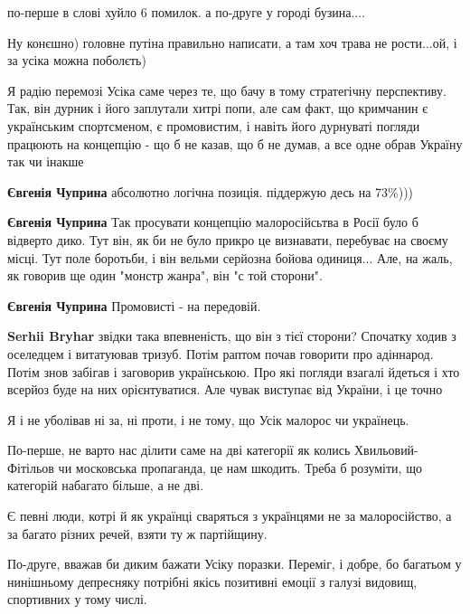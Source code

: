 \begin{itemize}
\begin{itemize}
по-перше в слові хуйло 6 помилок. а по-друге у городі бузина....

Ну конєшно) головне путіна правильно написати, а там хоч трава не рости...ой, і за усіка можна поболєть)
\end{itemize} %


Я радію перемозі Усіка саме через те, що бачу в тому стратегічну перспективу.
Так, він дурник і його заплутали хитрі попи, але сам факт, що кримчанин є
українським спортсменом, є промовистим, і навіть його дурнуваті погляди
працюють на концепцію - що б не казав, що б не думав, а все одне обрав Україну
так чи інакше

\begin{itemize} %
\textbf{Євгенія Чуприна} абсолютно логічна позиція. піддержую десь на 73\%)))

\textbf{Євгенія Чуприна} Так просувати концепцію малоросійсьтва в Росії було б відверто дико. Тут він, як би не було прикро це визнавати, перебуває на своєму місці. Тут поле боротьби, і він вельми серйозна бойова одиниця... Але, на жаль, як говорив ще один "монстр жанра", він "с той сторони".

\textbf{Євгенія Чуприна}
Промовисті - на передовій.

\textbf{Serhii Bryhar} звідки така впевненість, що він з тієї сторони? Спочатку ходив з оселедцем і витатуював тризуб. Потім раптом почав говорити про адіннарод. Потім знов забігав і заговорив українською. Про які погляди взагалі йдеться і хто всерйоз буде на них орієнтуватися. Але чувак виступає від України, і це точно
\end{itemize} %


Я і не уболівав ні за, ні проти, і не тому, що Усік малорос чи українець.

По-перше, не варто нас ділити саме на дві категорії як колись
Хвильовий-Фітільов чи московська пропаганда, це нам шкодить. Треба б розуміти,
що категорій набагато більше, а не дві.

Є певні люди, котрі й як українці сваряться з українцями не за малоросійство, а
за багато різних речей, взяти ту ж партійщину.

По-друге, вважав би диким бажати Усіку поразки. Переміг, і добре, бо багатьом у
нинішньому депресняку потрібні якісь позитивні емоції з галузі видовищ,
спортивних у тому числі.


\end{itemize}
